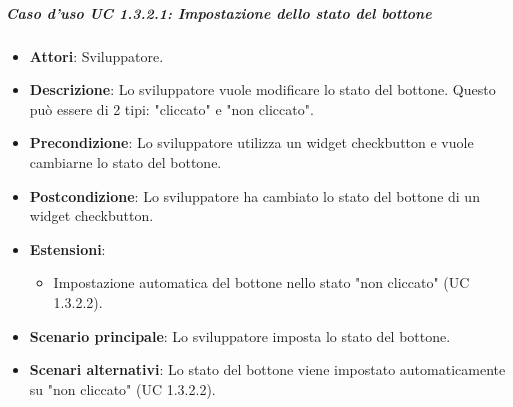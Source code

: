 \subparagraph{Caso d'uso UC 1.3.2.1: Impostazione dello stato del bottone}
\label{UC 1.3.2.1: Impostare lo stato del bottone}
\FloatBarrier
\begin{itemize}
\item\textbf{Attori}: Sviluppatore.
\item\textbf{Descrizione}: Lo sviluppatore vuole modificare lo stato del bottone. Questo può essere di 2 tipi: "cliccato" e "non cliccato".
\item\textbf{Precondizione}: Lo sviluppatore utilizza un widget checkbutton e vuole cambiarne lo stato del bottone.
\item\textbf{Postcondizione}: Lo sviluppatore ha cambiato lo stato del bottone di un widget checkbutton.
\item\textbf{Estensioni}: 
\begin{itemize}
\item Impostazione automatica del bottone nello stato "non cliccato" (UC 1.3.2.2).
\end{itemize}
\item\textbf{Scenario principale}: Lo sviluppatore imposta lo stato del bottone.
\item\textbf{Scenari alternativi}: Lo stato del bottone viene impostato automaticamente su "non cliccato" (UC 1.3.2.2).
\end{itemize}
